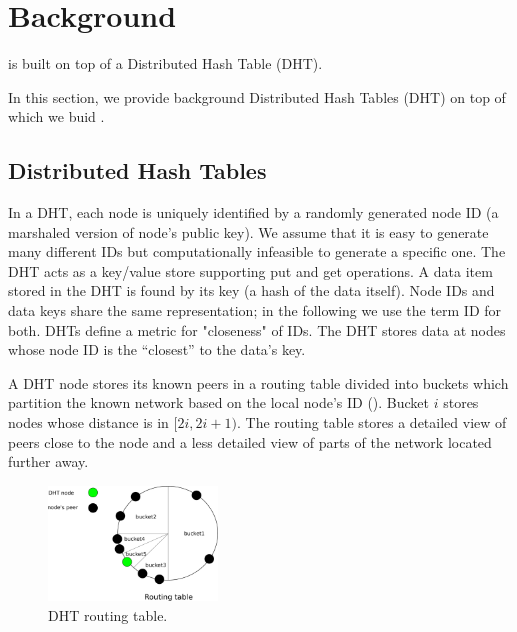 \section{Background}
\label{sec:background}
\sysname is built on top of a Distributed Hash Table (DHT). 

In this section, we provide background Distributed Hash Tables (DHT) on top of which we buid \sysname. 

\subsection{Distributed Hash Tables}
In a DHT, each node is uniquely identified by a randomly generated node ID (\eg a marshaled version of node's public key). We assume that it is easy to generate many different IDs but computationally infeasible to generate a specific one. The DHT acts as a key/value store supporting put and get operations. A data item stored in the DHT is found by its key (\eg a hash of the data itself). Node IDs and data keys share the same representation; in the following we use the term ID for both. DHTs define a metric for "closeness" of IDs. The DHT stores data at nodes whose node ID is the “closest” to the data’s key. 

A DHT node stores its known peers in a routing table divided into buckets which partition the known network based on the local node’s ID (). Bucket $i$ stores nodes whose distance is in $[2i, 2i+1)$. The routing table stores a detailed view of peers close to the node and a less detailed view of parts of the network located further away.


\begin{figure}
    \includegraphics[width=0.4\textwidth]{img/kademlia}
    \caption{DHT routing table.}
    \label{fig:kademlia}
 \end{figure}
 

